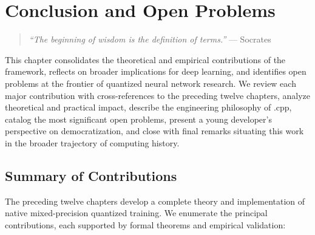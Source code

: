 
\chapter{Conclusion and Open Problems}
\label{ch:conclusion}

\begin{quote}
\textit{``The beginning of wisdom is the definition of terms.''} --- Socrates
\end{quote}

This chapter consolidates the theoretical and empirical contributions of the \OIL{} framework, reflects on broader implications for deep learning, and identifies open problems at the frontier of quantized neural network research. We review each major contribution with cross-references to the preceding twelve chapters, analyze theoretical and practical impact, describe the engineering philosophy of \MYTHOS{}.cpp, catalog the most significant open problems, present a young developer's perspective on democratization, and close with final remarks situating this work in the broader trajectory of computing history.

\section{Summary of Contributions}
\label{sec:summary_conclusion}

The preceding twelve chapters develop a complete theory and implementation of native mixed-precision quantized training. We enumerate the principal contributions, each supported by formal theorems and empirical validation:

